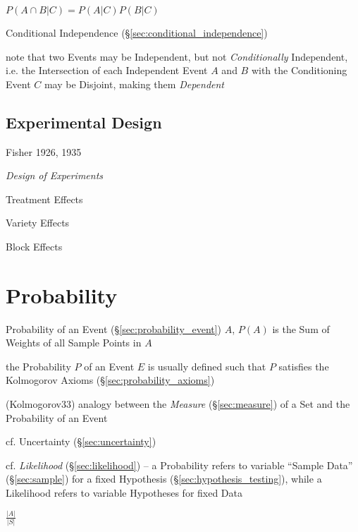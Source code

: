 $P(A \cap B | C) = P(A|C)P(B|C)$

\fist Conditional Independence (\S\ref{sec:conditional_independence})

note that two Events may be Independent, but not \emph{Conditionally}
Independent, i.e. the Intersection of each Independent Event $A$ and $B$ with
the Conditioning Event $C$ may be Disjoint, making them \emph{Dependent}



\subsection{Experimental Design}\label{sec:experimental_design}


Fisher 1926, 1935

\emph{Design of Experiments}

Treatment Effects

Variety Effects

Block Effects



\section{Probability}\label{sec:probability}

Probability of an Event (\S\ref{sec:probability_event}) $A$, $P(A)$ is the Sum
of Weights of all Sample Points in $A$

the Probability $P$ of an Event $E$ is usually defined such that $P$ satisfies
the Kolmogorov Axioms (\S\ref{sec:probability_axioms})

(Kolmogorov33) analogy between the \emph{Measure} (\S\ref{sec:measure}) of a Set
and the Probability of an Event

cf. Uncertainty (\S\ref{sec:uncertainty})

cf. \emph{Likelihood} (\S\ref{sec:likelihood}) -- a Probability refers to
variable ``Sample Data'' (\S\ref{sec:sample}) for a fixed Hypothesis
(\S\ref{sec:hypothesis_testing}), while a Likelihood refers to variable
Hypotheses for fixed Data

$\frac{|A|}{|S|}$


